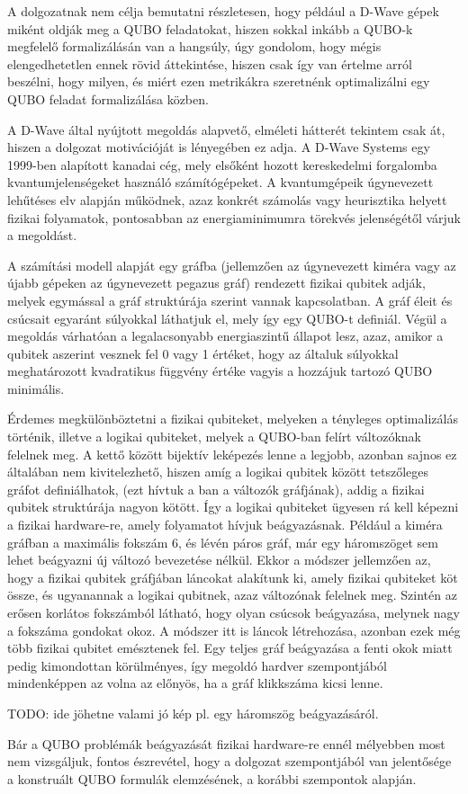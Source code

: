 A dolgozatnak nem célja bemutatni részletesen, hogy például a D-Wave gépek miként oldják meg a QUBO feladatokat, hiszen sokkal inkább a QUBO-k megfelelő formalizálásán van a hangsúly, úgy gondolom, hogy mégis elengedhetetlen ennek rövid áttekintése, hiszen csak így van értelme arról beszélni, hogy milyen, és miért ezen metrikákra szeretnénk optimalizálni egy QUBO feladat formalizálása közben.

A D-Wave által nyújtott megoldás alapvető, elméleti hátterét tekintem csak át, hiszen a dolgozat motivációját is lényegében ez adja. A D-Wave Systems egy 1999-ben alapított kanadai cég, mely elsőként hozott kereskedelmi forgalomba kvantumjelenségeket használó számítógépeket. A kvantumgépeik úgynevezett lehűtéses elv alapján működnek, azaz konkrét számolás vagy heurisztika helyett fizikai folyamatok, pontosabban az energiaminimumra törekvés jelenségétől várjuk a megoldást. \cite{Szabo}

A számítási modell alapját egy gráfba (jellemzően az úgynevezett kiméra vagy az újabb gépeken az úgynevezett pegazus gráf) rendezett fizikai qubitek adják, melyek  egymással a gráf struktúrája szerint vannak kapcsolatban. A gráf éleit és csúcsait egyaránt súlyokkal láthatjuk el, mely így egy QUBO-t definiál. Végül a megoldás várhatóan a legalacsonyabb energiaszintű állapot lesz, azaz, amikor a qubitek aszerint vesznek fel 0 vagy 1 értéket, hogy az általuk súlyokkal meghatározott kvadratikus függvény értéke vagyis a hozzájuk tartozó QUBO minimális.

Érdemes megkülönböztetni a fizikai qubiteket, melyeken a tényleges optimalizálás történik, illetve a logikai qubiteket, melyek a QUBO-ban felírt változóknak felelnek meg. A kettő között bijektív leképezés lenne a legjobb, azonban sajnos ez általában nem kivitelezhető, hiszen amíg a logikai qubitek között tetszőleges gráfot definiálhatok, (ezt hívtuk a ban a változók gráfjának), addig a fizikai qubitek struktúrája nagyon kötött. Így a logikai qubiteket ügyesen rá kell képezni a fizikai hardware-re, amely folyamatot hívjuk beágyazásnak.
Például a kiméra gráfban a maximális fokszám 6, és lévén páros gráf, már egy háromszöget sem lehet beágyazni új változó bevezetése nélkül. Ekkor a módszer jellemzően az, hogy a fizikai qubitek gráfjában láncokat alakítunk ki, amely fizikai qubiteket köt össze, és ugyanannak a logikai qubitnek, azaz változónak felelnek meg. Szintén az erősen korlátos fokszámból látható, hogy olyan csúcsok beágyazása, melynek nagy a fokszáma gondokat okoz. A módszer itt is láncok létrehozása, azonban ezek még több fizikai qubitet emésztenek fel. Egy teljes gráf beágyazása a fenti okok miatt pedig kimondottan körülményes, így megoldó hardver szempontjából mindenképpen az volna az előnyös, ha a gráf klikkszáma kicsi lenne.

TODO: ide jöhetne valami jó kép pl. egy háromszög beágyazásáról.

Bár a QUBO problémák beágyazását fizikai hardware-re ennél mélyebben most nem vizsgáljuk, fontos észrevétel, hogy a dolgozat szempontjából van jelentősége a konstruált QUBO formulák elemzésének, a korábbi szempontok alapján.